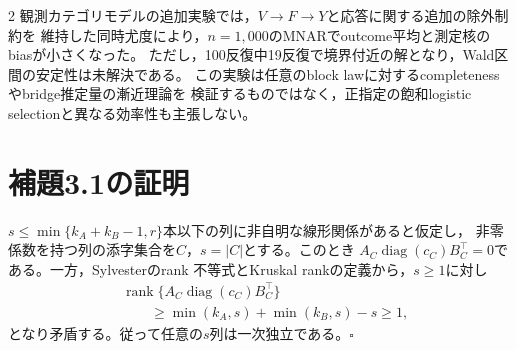 \documentclass[a4paper,10pt]{article}
\begin{document}
\begin{multicols}{2}
観測カテゴリモデルの追加実験では，$V\to F\to Y$と応答に関する追加の除外制約を
維持した同時尤度により，$n=1{,}000$のMNARでoutcome平均と測定核のbiasが小さくなった。
ただし，100反復中19反復で境界付近の解となり，Wald区間の安定性は未解決である。
この実験は任意のblock lawに対するcompletenessやbridge推定量の漸近理論を
検証するものではなく，正指定の飽和logistic selectionと異なる効率性も主張しない。

\appendix
\section{補題3.1の証明}
$s\le\min\{k_A+k_B-1,r\}$本以下の列に非自明な線形関係があると仮定し，
非零係数を持つ列の添字集合を$C$，$s=|C|$とする。このとき
$A_C\operatorname{diag}(c_C)B_C^\top=0$である。一方，Sylvesterのrank
不等式とKruskal rankの定義から，$s\ge1$に対し
\begin{equation}
\begin{aligned}
&\operatorname{rank}\{A_C\operatorname{diag}(c_C)B_C^\top\}\\
&\qquad\ge\min(k_A,s)+\min(k_B,s)-s\ge1,
\end{aligned}
\label{eq:sylvester-rank-bound}
\end{equation}
となり矛盾する。従って任意の$s$列は一次独立である。\hfill$\square$


\end{multicols}
\end{document}
